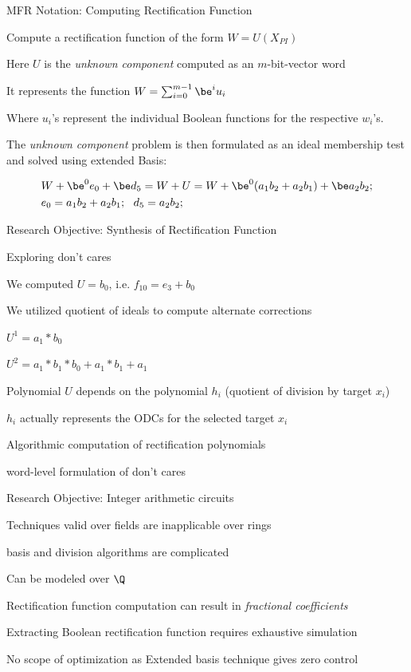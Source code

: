 \begin{frame}{\large MFR Notation: Computing Rectification Function}
\bi
	\item Compute a rectification function of the form $W = U(X_{PI})$ 
	\bi
		\item Here $U$ is the \textit{unknown component} computed as an $m$-bit-vector word
		\item It represents the function $W = \sum_{i=0}^{m-1}\be^iu_i$ 
		\bi
			\item Where $u_i$'s represent the individual Boolean functions for the respective $w_i$'s.
		\ei
	\ei
	\item The \textit{unknown component} problem is then formulated as an ideal membership test and
	solved using extended \Grobner Basis: 
	\begin{center}
		\begin{align*}
		&W + \be^0 e_0 + \be d_5  = W + U = W +\be^0(a_1b_2+a_2b_1)+\be a_2b_2;\\
		&e_0 = a_1b_2+a_2b_1;~~d_5 = a_2b_2;
		\end{align*}
	\end{center}
\ei
\end{frame}

\begin{frame}{\large Research Objective: Synthesis of Rectification Function}
\bi
	\item Exploring don't cares
	\bi
		\item We computed $U=b_0$, i.e. $f_{10} = e_3 + b_0$
		\item We utilized quotient of ideals to compute alternate corrections
		\bi
			\item ${U^1} = a_1*b_0$
			\item ${U^2} = a_1*b_1*b_0+a_1*b_1+a_1$
		\ei
		\item Polynomial $U$ depends on the polynomial $h_i$ (quotient of division by target $x_i$) 
		\item $h_i$ actually represents the ODCs for the selected target $x_i$
	\ei
	\item Algorithmic computation of rectification polynomials
	\item word-level formulation of don't cares
\ei
\end{frame}



\begin{frame}{\large Research Objective: Integer arithmetic circuits}
\bi
	\item Techniques valid over fields are inapplicable over rings
	\item \Grobner basis and division algorithms are complicated
	\item Can be modeled over $\Q$
	\bi
		\item Rectification function computation can result in {\it fractional coefficients}
		\item Extracting Boolean rectification function requires exhaustive simulation
		\item No scope of optimization as Extended \Grobner basis technique gives zero control
	\ei
\ei

\end{frame}

